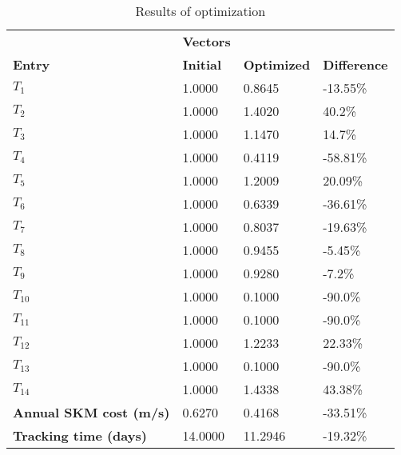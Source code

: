 \begin{table}[H]
\centering
\begin{tabular}{llll}
\textbf{}      & \cellcolor[HTML]{EFEFEF}\textbf{Vectors} & \textbf{} & \textbf{}         \\
\rowcolor[HTML]{EFEFEF} 
\textbf{Entry} & \textbf{Initial} & \textbf{Optimized} & \textbf{Difference} \\
$T_1$ & 1.0000 & 0.8645 & -13.55\% \\ 
$T_2$ & 1.0000 & 1.4020 & 40.2\% \\ 
$T_3$ & 1.0000 & 1.1470 & 14.7\% \\ 
$T_4$ & 1.0000 & 0.4119 & -58.81\% \\ 
$T_5$ & 1.0000 & 1.2009 & 20.09\% \\ 
$T_6$ & 1.0000 & 0.6339 & -36.61\% \\ 
$T_7$ & 1.0000 & 0.8037 & -19.63\% \\ 
$T_8$ & 1.0000 & 0.9455 & -5.45\% \\ 
$T_9$ & 1.0000 & 0.9280 & -7.2\% \\ 
$T_10$ & 1.0000 & 0.1000 & -90.0\% \\ 
$T_11$ & 1.0000 & 0.1000 & -90.0\% \\ 
$T_12$ & 1.0000 & 1.2233 & 22.33\% \\ 
$T_13$ & 1.0000 & 0.1000 & -90.0\% \\ 
$T_14$ & 1.0000 & 1.4338 & 43.38\% \\ 
\rowcolor[HTML]{EFEFEF} 
\textbf{Annual SKM cost (m/s)}  & 0.6270 & 0.4168 & -33.51\% \\ 
\rowcolor[HTML]{EFEFEF} 
\textbf{Tracking time (days)}  & 14.0000 & 11.2946 & -19.32\% \\ 
\end{tabular}
\caption{Results of optimization}
\label{tab:OptimizationAnalysis}
\end{table}